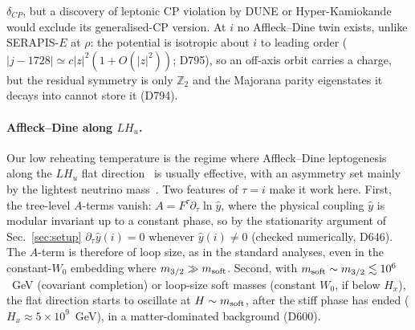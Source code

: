 \documentclass[aps,prd,twocolumn,superscriptaddress,nofootinbib,floatfix]{revtex4-2}
\begin{document}
$\delta_{CP}$, but a discovery of leptonic CP violation by DUNE or Hyper-Kamiokande would exclude its generalised-CP version. At $i$ no Affleck--Dine twin exists, unlike SERAPIS-$E$ at $\rho$: the potential is isotropic about $i$ to leading order ($|j-1728|\simeq c|z|^2(1+O(|z|^2))$; D795), so an off-axis orbit carries a charge, but the residual symmetry is only $\mathbb{Z}_2$ and the Majorana parity eigenstates it decays into cannot store it (D794).

\paragraph{Affleck--Dine along $LH_u$.} Our low reheating temperature is the regime where Affleck--Dine leptogenesis~\cite{AffleckDine1985,arXiv_hep-ph_9507453} along the $LH_u$ flat direction~\cite{arXiv_hep-ph_9310297} is usually effective, with an asymmetry set mainly by the lightest neutrino mass~\cite{arXiv_hep-ph_0102187,arXiv_hep-ph_0109154}. Two features of $\tau=i$ make it work here. First, the tree-level $A$-terms vanish: $A=F^\tau\partial_\tau\ln\hat y$, where the physical coupling $\hat y$ is modular invariant up to a constant phase, so by the stationarity argument of Sec.~\ref{sec:setup} $\partial_\tau\hat y(i)=0$ whenever $\hat y(i)\neq0$ (checked numerically, D646). The $A$-term is therefore of loop size, as in the standard analyses, even in the constant-$W_0$ embedding where $m_{3/2}\gg m_{\rm soft}$. Second, with $m_{\rm soft}\sim m_{3/2}\lesssim10^6$~GeV (covariant completion) or loop-size soft masses (constant $W_0$, if below $H_x$), the flat direction starts to oscillate at $H\sim m_{\rm soft}$, after the stiff phase has ended ($H_x\approx5\times10^9$~GeV), in a matter-dominated background (D600).
\end{document}
